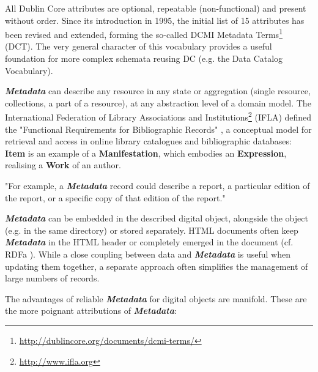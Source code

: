 \documentclass[a4paper,english,twoside,BCOR1.5cm,headsepline,DIV12,appendixprefix,final,12pt]{scrbook}
\newcommand{\prop}[1]{{{\texttt{#1}}}}
\newcommand{\important}[1]{\textbf{\textit{#1}}}
\newcommand\footnoteurl[1]{\footnote{\scriptsize\url{#1}}}
\begin{document}
All Dublin Core attributes are optional, repeatable (non-functional) and present without order. 
Since its introduction in 1995, the initial list of 15 attributes has been revised and extended, forming the so-called DCMI Metadata Terms\footnoteurl{http://dublincore.org/documents/dcmi-terms/} (DCT). The very general character of this vocabulary provides a useful foundation for more complex schemata reusing DC (e.g. the Data Catalog Vocabulary).

\important{Metadata} can describe any resource in any state or aggregation (single resource, collections, a part of a resource), at any abstraction level of a domain model.
The International Federation of Library Associations and Institutions\footnoteurl{http://www.ifla.org} (IFLA) defined the "Functional Requirements for Bibliographic Records" \cite{IFLA-Functional-1998}, a conceptual model for retrieval and access in online library catalogues and bibliographic databases: \textbf{Item} is an example of a \textbf{Manifestation}, which embodies an \textbf{Expression}, realising a \textbf{Work} of an author.

"For example, a \important{Metadata} record could describe a report, a particular edition of the report, or a specific copy of that edition of the report." \cite{NISO2004}

\important{Metadata} can be embedded in the described digital object, alongside the object (e.g. in the same directory) or stored separately. HTML documents often keep \important{Metadata} in the HTML header or completely emerged in the document (cf. RDFa \cite{McCarronRDFaW3C2015}). While a close coupling between data and \important{Metadata} is useful when updating them together, a separate approach often simplifies the management of large numbers of records.

The advantages of reliable \important{Metadata} for digital objects are manifold. These are the more poignant attributions of \important{Metadata}:
\end{document}
